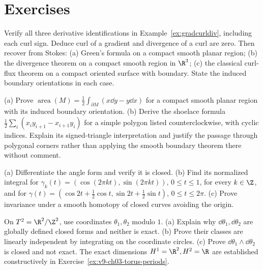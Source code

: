 \section{Exercises}

\begin{exercise}[$\star$]\label{ex:gradcurl}
Verify all three derivative identifications in Example~\ref{ex:gradcurldiv}, including each curl sign. Deduce curl of a gradient and divergence of a curl are zero. Then recover from Stokes:
(a) Green's formula on a compact smooth planar region;
(b) the divergence theorem on a compact smooth region in $\R^3$;
(c) the classical curl-flux theorem on a compact oriented surface with boundary. State the induced boundary orientations in each case.
\end{exercise}

\begin{exercise}[$\star$]\label{ex:shoelace}
(a) Prove $\operatorname{area}(M)=\tfrac12\int_{\partial M}(x\dd y-y\dd x)$ for a compact smooth planar region with its induced boundary orientation.
(b) Derive the shoelace formula $\tfrac12\sum_i(x_iy_{i+1}-x_{i+1}y_i)$ for a simple polygon listed counterclockwise, with cyclic indices. Explain its signed-triangle interpretation and justify the passage through polygonal corners rather than applying the smooth boundary theorem there without comment.
\end{exercise}

\begin{exercise}[$\star$]\label{ex:windingcompute}
(a) Differentiate the angle form and verify it is closed.
(b) Find its normalized integral for $\gamma_k(t)=(\cos(2\pi kt),\sin(2\pi kt))$, $0\le t\le1$, for every $k\in\Z$, and for $\gamma(t)=(\cos2t+\tfrac12\cos t,\sin2t+\tfrac12\sin t)$, $0\le t\le2\pi$.
(c) Prove invariance under a smooth homotopy of closed curves avoiding the origin.
\end{exercise}

\begin{exercise}[$\star$]\label{ex:toruscohomology}
On $T^2=\R^2/\Z^2$, use coordinates $\theta_1,\theta_2$ modulo $1$.
(a) Explain why $\dd\theta_1,\dd\theta_2$ are globally defined closed forms and neither is exact.
(b) Prove their classes are linearly independent by integrating on the coordinate circles.
(c) Prove $\dd\theta_1\wedge\dd\theta_2$ is closed and not exact. The exact dimensions $H^1=\R^2,H^2=\R$ are established constructively in Exercise~\ref{ex:v9-ch03-torus-periods}.
\end{exercise}


